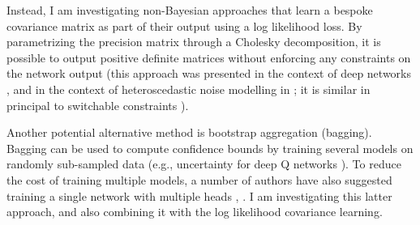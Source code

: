  Instead, I am investigating non-Bayesian approaches that learn a bespoke covariance matrix as part of their output using a log likelihood loss. By parametrizing the precision matrix through a Cholesky decomposition, it is possible to output positive definite matrices without enforcing any constraints on the network output (this approach was presented in the context of deep networks \citep{Haarnoja2016-ph}, and in the context of heteroscedastic noise modelling in \citep{Hu2015-uw}; it is similar in principal to switchable constraints \citep{Agarwal2013-jq}).
 
 Another potential alternative method is bootstrap aggregation (bagging). Bagging can be used to compute confidence bounds by training several models on randomly sub-sampled data (e.g., uncertainty for deep Q networks \citep{Osband2016-jg}). To reduce the cost of training multiple models, a number of authors have also suggested training a single network with multiple heads \citep{Lee2015-af}, \citep{Lakshminarayanan2016-zh}. I am investigating this latter approach, and also combining it with the log likelihood covariance learning.

